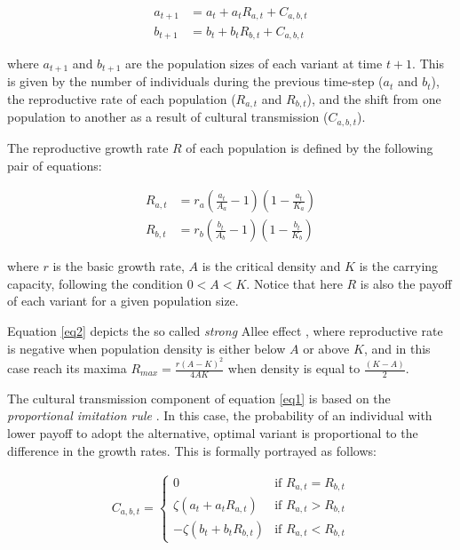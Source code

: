 \documentclass[review,authoryear]{elsarticle}
\begin{document}
\begin{equation}
\begin{aligned}
a_{t+1}& = a_t + a_t R_{a,t} + C_{a,b,t} \\
b_{t+1}& = b_t + b_t R_{b,t} + C_{a,b,t}
\label{eq1}
\end{aligned}
\end{equation}

where $a_{t+1}$ and $b_{t+1}$ are the population sizes of each variant at time $t+1$. This is given by the number of individuals during the previous time-step ($a_t$ and $b_t$), the reproductive rate of each population ($R_{a,t}$ and $R_{b,t}$), and the shift from one population to another as a result of cultural transmission ($C_{a,b,t}$).

The reproductive growth rate $R$ of each population is defined by the following pair of equations:

\begin{equation}
\begin{aligned}
R_{a,t}& = r_a \left(\frac{a_t}{A_a}-1\right)\left(1-\frac{a_t}{K_a}\right)\\
R_{b,t}& = r_b \left(\frac{b_t}{A_b}-1\right)\left(1-\frac{b_t}{K_b}\right) 
\label{eq2}
\end{aligned}
\end{equation}

where $r$ is the basic growth rate, $A$ is the critical density and $K$ is the carrying capacity, following the condition $0<A < K$. Notice that here $R$ is also the payoff of each variant for a given population size.  

Equation \eqref{eq2} depicts the so called \emph{strong} Allee effect \citep{Wang_and_Kot_2001}, where reproductive rate is negative when population density is either below $A$ or above $K$, and in this case reach its maxima $R_{max}=\frac{r(A-K)^2}{4AK}$ when density is equal to $\frac{(K-A)}{2}$. 

The cultural transmission component of equation \eqref{eq1} is based on the \emph{proportional imitation rule} \citep{schlag1998}. In this case, the probability of an individual with lower payoff to adopt the alternative, optimal variant is proportional to the difference in the growth rates. This is formally portrayed as follows:

\begin{equation}
\begin{aligned}
\label{eq3}
C_{a,b,t} = 
\begin{cases}
0& \text{if } R_{a,t} = R_{b,t}\\
\zeta(a_t+a_tR_{a,t})& \text{if } R_{a,t} > R_{b,t}\\
-\zeta(b_t+b_tR_{b,t})& \text{if } R_{a,t} < R_{b,t}
\end{cases}
\end{aligned}
\end{equation}
\end{document}
